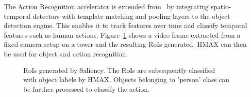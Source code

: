 The Action Recognition accelerator is extended from~\cite{action-recognition} by integrating spatio-temporal detectors with template matching and pooling layers to the object detection engine. This enables it to track features over time and classify temporal features such as human actions. Figure~\ref{fig:RoIs_campus_000042} shows a video frame extracted from a fixed camera setup on a tower and the resulting RoIs generated. HMAX can then be used for object and action recognition.

\begin{figure}[ht!]
\centering
{}
\caption{\label{fig:RoIs_campus_000042} RoIs generated by Saliency. The RoIs are subsequently classified with object labels by HMAX. Objects belonging to 'person' class can be further processed to classify the action.}
\vspace{-0.2in}
\end{figure}

